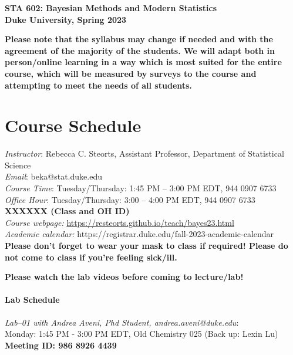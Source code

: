 \documentclass[11pt]{article}
\date{}
\begin{document}
\begin{center}
{\Large\bf STA 602: Bayesian Methods and Modern Statistics} \\

{\Large\bf Duke University, Spring 2023} \\
\end{center}

\textbf{Please note that the syllabus may change if needed and with the agreement of the majority of the students. We will adapt both in person/online learning in a way which is most suited for the entire course, which will be measured by surveys to the course and attempting to meet the needs of all students.} \\

\section{Course Schedule}
\emph{Instructor}: Rebecca C. Steorts,  Assistant Professor,  Department of Statistical Science\\
\emph{Email}: beka@stat.duke.edu\\
\emph{Course Time}: Tuesday/Thursday: 1:45 PM -- 3:00 PM EDT, 944 0907 6733 \\
\emph{Office Hour}: Tuesday/Thursday: 3:00 -- 4:00 PM EDT, 944 0907 6733\\
\textbf{XXXXXX (Class and OH ID)}\\
\emph{Course webpage:} \url{https://resteorts.github.io/teach/bayes23.html} \\
\emph{Academic calendar:} https://registrar.duke.edu/fall-2023-academic-calendar \\
\textbf{Please don't forget to wear your mask to class if required! Please do not come to class if you're feeling sick/ill.}

\vspace*{1em}

\textbf{Please watch the lab videos before coming to lecture/lab!}
\paragraph{Lab Schedule} 

\emph{Lab--01 with Andrea Aveni, Phd Student, andrea.aveni@duke.edu}: \\Monday: 1:45 PM - 3:00 PM EDT, Old Chemistry 025 (Back up: Lexin Lu) \\
\textbf{Meeting ID: 986 8926 4439}\\
\end{document}
